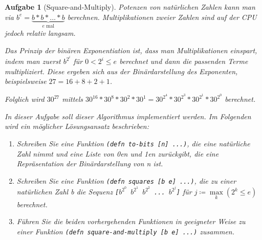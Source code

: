 \documentclass[11pt,a4paper]{article}
\newcounter{numb}
\theoremstyle{break}
\newtheorem{aufgabe}{Aufgabe}[numb]
\begin{document}
\begin{aufgabe}[Square-and-Multiply]

Potenzen von nat\"urlichen Zahlen kann man via $b^e = \underbrace{b * b * ... * b}_{e\text{ mal}}$ berechnen.
Multiplikationen zweier Zahlen sind auf der CPU jedoch relativ langsam.

Das Prinzip der bin\"aren Exponentiation ist, dass man Multiplikationen einspart, indem man  zuerst $b^{2^i}$ f\"ur $0 < 2^i \leq e$ berechnet und dann die passenden Terme multipliziert. Diese ergeben sich aus der Bin\"ardarstellung des Exponenten, beispielsweise $27 = 16 + 8 + 2 + 1$.

Folglich wird $30^{27}$ mittels $30^{16} * 30^8 * 30^2 * 30^1 = 30^{2^4} * 30^{2^3} * 30^{2^1} * 30^{2^0}$ berechnet.

In dieser Aufgabe soll dieser Algorithmus implementiert werden. Im Folgenden wird ein m\"oglicher L\"osungsansatz beschrieben:

\begin{enumerate}[label=\alph*)]
\item
  Schreiben Sie eine Funktion \texttt{(defn to-bits [n] ...)}, die eine nat\"urliche Zahl nimmt und eine Liste von 0en und 1en zur\"uckgibt, die eine Repr\"asentation der Bin\"ardarstellung von n ist.
\item 
    Schreiben Sie eine Funktion \texttt{(defn squares [b e] ...)}, die zu einer nat\"urlichen Zahl b die Sequenz \texttt{[$b^{2^0}$ $b^{2^1}$ $b^{2^2}$ ... $b^{2^j}$]} f\"ur $j \coloneqq \max\limits_{k} (2^k \leq e)$  berechnet.
\item
  F\"uhren Sie die beiden vorhergehenden Funktionen in geeigneter Weise zu einer Funktion \texttt{(defn square-and-multiply [b e] ...)} zusammen.
\end{enumerate}
\end{aufgabe}
\end{document}
